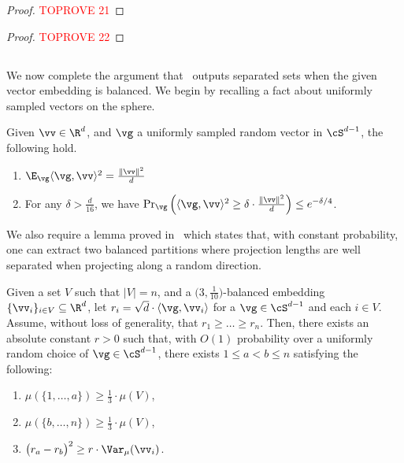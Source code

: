 \documentclass[letterpaper]{article}
\begin{document}
\asymCutStratWidth*
\begin{proof}\textcolor{red}{TOPROVE 21}\end{proof}

\unbalancedprevious*
\begin{proof}\textcolor{red}{TOPROVE 22}\end{proof}
 
\subsection{}
\label{sec.appendix.omitted.separated}
We now complete the argument that \roundcut~outputs separated sets when the given vector embedding is balanced. We begin by recalling a fact about uniformly sampled vectors on the sphere.

\begin{lemma}
\label{lem.gaussian-facts}
Given $\vv \in \R^{d}$, and $\vg$ a uniformly sampled random vector in $\cS^{d-1}$, the following hold.
\begin{enumerate}
\item $\E_{\vg} \langle \vg, \vv \rangle^2 = \frac{\lVert \vv \rVert^2}{d}$

\item For any $\delta > \frac{d}{16}$, we have $\Pr_{\vg} \Big( \langle \vg, \vv \rangle^2 \geq \delta \cdot \frac{\lVert \vv \rVert^2}{d} \Big) \leq e^{-\delta / 4}$.
\end{enumerate}
\end{lemma}

We also require a lemma proved in~\cite{LorenzosThesis} which states that, with constant probability, one can extract two balanced partitions where projection lengths are well separated when projecting along a random direction.

\begin{lemma}
\label{lem.balanced-separated-set}
Given a set $V$ such that $\lvert V \rvert = n$, and a $\big( 3, \frac{1}{10} \big)$-balanced embedding $\{ \vv_i \}_{i \in V} \subseteq \R^d$, let $r_i = \sqrt{d} \cdot \langle \vg, \vv_i \rangle$ for a $\vg \in \cS^{d-1}$ and each $i \in V$. Assume, without loss of generality, that $r_1 \geq \ldots \geq r_n$. Then, there exists an absolute constant $r > 0$ such that, with $O(1)$ probability over a uniformly random choice of $\vg \in \cS^{d-1}$, there exists $1 \leq a < b \leq n$ satisfying the following:
\begin{enumerate}
\item $\mu(\{ 1, \ldots, a \}) \geq \frac{1}{3} \cdot \mu(V)$,

\item $\mu(\{ b, \ldots, n \}) \geq \frac{1}{3} \cdot \mu(V)$,

\item $\big( r_{a} - r_{b} \big)^2 \geq r \cdot \Var_{\mu}(\vv_i)$.
\end{enumerate}
\end{lemma}
\end{document}
